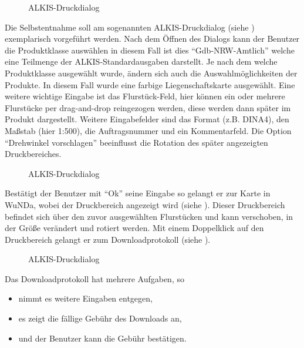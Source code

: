 \begin{figure}[htbp]
	\centering
	\caption{ALKIS-Druckdialog}
	\label{fig:alkis-druck}
\end{figure}

Die Selbstentnahme soll am sogenannten ALKIS-Druckdialog (siehe ) exemplarisch vorgeführt werden.
Nach dem Öffnen des Dialogs kann der Benutzer die Produktklasse auswählen in diesem Fall ist dies "`Gdb-NRW-Amtlich"' welche eine Teilmenge der ALKIS-Standardausgaben darstellt. 
Je nach dem welche Produktklasse ausgewählt wurde, ändern sich auch die Auswahlmöglichkeiten der Produkte. In diesem Fall wurde eine farbige Liegenschaftskarte ausgewählt.
Eine weitere wichtige Eingabe ist das Flurstück-Feld, hier können ein oder mehrere Flurstücke per drag-and-drop reingezogen werden, diese werden dann später im Produkt dargestellt.
Weitere Eingabefelder sind das Format (z.B. DINA4), den  Maßstab (hier 1:500), die Auftragsnummer und ein Kommentarfeld. Die Option "`Drehwinkel vorschlagen"' beeinflusst die Rotation des später angezeigten Druckbereiches.

\begin{figure}[htbp]
	\centering
	\caption{ALKIS-Druckdialog}
	\label{fig:alkis-auswahl}
\end{figure}

Bestätigt der Benutzer mit "`Ok"' seine Eingabe so gelangt er zur Karte in \ac{WuNDa}, wobei der Druckbereich angezeigt wird (siehe ).
Dieser Druckbereich befindet sich über den zuvor ausgewählten Flurstücken und kann verschoben, in der Größe verändert und rotiert werden.
Mit einem Doppelklick auf den Druckbereich gelangt er zum Downloadprotokoll (siehe ).  

\begin{figure}[htbp]
	\centering
	\caption{ALKIS-Druckdialog}
	\label{fig:alkis-protocol}
\end{figure}

Das Downloadprotokoll hat mehrere Aufgaben, so 
\begin{itemize}
\item nimmt es weitere Eingaben entgegen,
\item es zeigt die fällige Gebühr des Downloads an,
\item und der Benutzer kann die Gebühr bestätigen.
\end{itemize}


